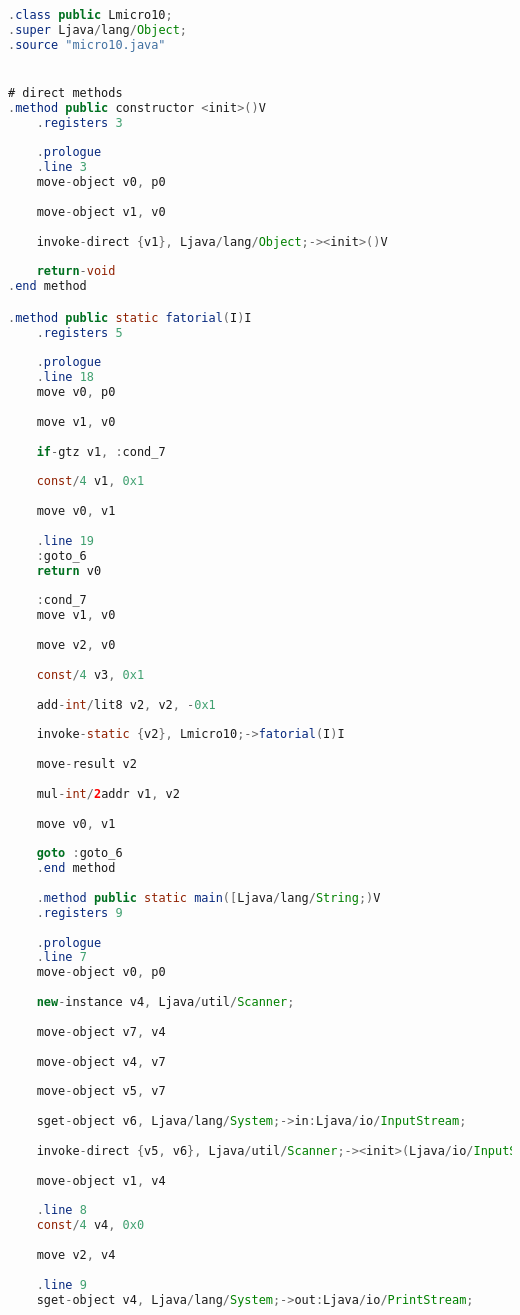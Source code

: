 \documentclass[hidelinks,12pt]{article}
\begin{document}
	\begin{lstlisting}[caption=Smali resultante do .java,language=java]
.class public Lmicro10;
.super Ljava/lang/Object;
.source "micro10.java"


# direct methods
.method public constructor <init>()V
	.registers 3
	
	.prologue
	.line 3
	move-object v0, p0
	
	move-object v1, v0
	
	invoke-direct {v1}, Ljava/lang/Object;-><init>()V
	
	return-void
.end method

.method public static fatorial(I)I
	.registers 5
	
	.prologue
	.line 18
	move v0, p0
	
	move v1, v0
	
	if-gtz v1, :cond_7
	
	const/4 v1, 0x1
	
	move v0, v1
	
	.line 19
	:goto_6
	return v0
	
	:cond_7
	move v1, v0
	
	move v2, v0
	
	const/4 v3, 0x1
	
	add-int/lit8 v2, v2, -0x1
	
	invoke-static {v2}, Lmicro10;->fatorial(I)I
	
	move-result v2
	
	mul-int/2addr v1, v2
	
	move v0, v1
	
	goto :goto_6
	.end method
	
	.method public static main([Ljava/lang/String;)V
	.registers 9
	
	.prologue
	.line 7
	move-object v0, p0
	
	new-instance v4, Ljava/util/Scanner;
	
	move-object v7, v4
	
	move-object v4, v7
	
	move-object v5, v7
	
	sget-object v6, Ljava/lang/System;->in:Ljava/io/InputStream;
	
	invoke-direct {v5, v6}, Ljava/util/Scanner;-><init>(Ljava/io/InputStream;)V
	
	move-object v1, v4
	
	.line 8
	const/4 v4, 0x0
	
	move v2, v4
	
	.line 9
	sget-object v4, Ljava/lang/System;->out:Ljava/io/PrintStream;
	

\end{lstlisting}
\end{document}
